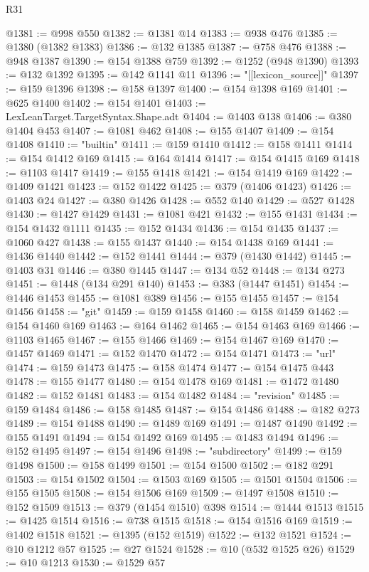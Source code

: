 \begin{lexlean}{R31}
\begin{coremodule}
@1381 := @998 @550
@1382 := @1381 @14
@1383 := @938 @476
@1385 := @1380 (@1382 @1383)
@1386 := @132 @1385
@1387 := @758 @476
@1388 := @948 @1387
@1390 := @154 @1388 @759
@1392 := @1252 (@948 @1390)
@1393 := @132 @1392
@1395 := @142 @1141 @11
@1396 := "[[lexicon_source]]"
@1397 := @159 @1396
@1398 := @158 @1397
@1400 := @154 @1398 @169
@1401 := @625 @1400
@1402 := @154 @1401
@1403 := LexLeanTarget.TargetSyntax.Shape.adt
@1404 := @1403 @138
@1406 := @380 @1404 @453
@1407 := @1081 @462
@1408 := @155 @1407
@1409 := @154 @1408
@1410 := "builtin"
@1411 := @159 @1410
@1412 := @158 @1411
@1414 := @154 @1412 @169
@1415 := @164 @1414
@1417 := @154 @1415 @169
@1418 := @1103 @1417
@1419 := @155 @1418
@1421 := @154 @1419 @169
@1422 := @1409 @1421
@1423 := @152 @1422
@1425 := @379 (@1406 @1423)
@1426 := @1403 @24
@1427 := @380 @1426
@1428 := @552 @140
@1429 := @527 @1428
@1430 := @1427 @1429
@1431 := @1081 @421
@1432 := @155 @1431
@1434 := @154 @1432 @1111
@1435 := @152 @1434
@1436 := @154 @1435
@1437 := @1060 @427
@1438 := @155 @1437
@1440 := @154 @1438 @169
@1441 := @1436 @1440
@1442 := @152 @1441
@1444 := @379 (@1430 @1442)
@1445 := @1403 @31
@1446 := @380 @1445
@1447 := @134 @52
@1448 := @134 @273
@1451 := @1448 (@134 @291 @140)
@1453 := @383 (@1447 @1451)
@1454 := @1446 @1453
@1455 := @1081 @389
@1456 := @155 @1455
@1457 := @154 @1456
@1458 := "git"
@1459 := @159 @1458
@1460 := @158 @1459
@1462 := @154 @1460 @169
@1463 := @164 @1462
@1465 := @154 @1463 @169
@1466 := @1103 @1465
@1467 := @155 @1466
@1469 := @154 @1467 @169
@1470 := @1457 @1469
@1471 := @152 @1470
@1472 := @154 @1471
@1473 := "url"
@1474 := @159 @1473
@1475 := @158 @1474
@1477 := @154 @1475 @443
@1478 := @155 @1477
@1480 := @154 @1478 @169
@1481 := @1472 @1480
@1482 := @152 @1481
@1483 := @154 @1482
@1484 := "revision"
@1485 := @159 @1484
@1486 := @158 @1485
@1487 := @154 @1486
@1488 := @182 @273
@1489 := @154 @1488
@1490 := @1489 @169
@1491 := @1487 @1490
@1492 := @155 @1491
@1494 := @154 @1492 @169
@1495 := @1483 @1494
@1496 := @152 @1495
@1497 := @154 @1496
@1498 := "subdirectory"
@1499 := @159 @1498
@1500 := @158 @1499
@1501 := @154 @1500
@1502 := @182 @291
@1503 := @154 @1502
@1504 := @1503 @169
@1505 := @1501 @1504
@1506 := @155 @1505
@1508 := @154 @1506 @169
@1509 := @1497 @1508
@1510 := @152 @1509
@1513 := @379 (@1454 @1510) @398
@1514 := @1444 @1513
@1515 := @1425 @1514
@1516 := @738 @1515
@1518 := @154 @1516 @169
@1519 := @1402 @1518
@1521 := @1395 (@152 @1519)
@1522 := @132 @1521
@1524 := @10 @1212 @57
@1525 := @27 @1524
@1528 := @10 (@532 @1525 @26)
@1529 := @10 @1213
@1530 := @1529 @57

\end{coremodule}
\end{lexlean}
